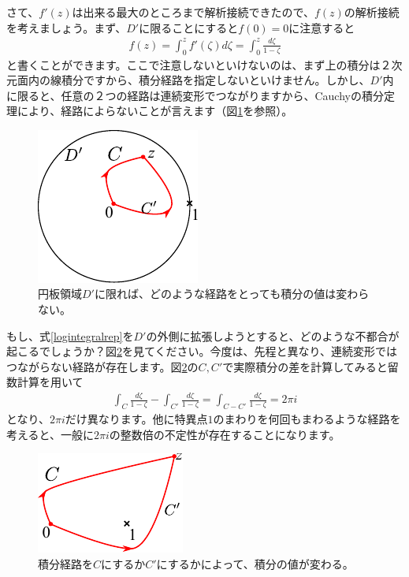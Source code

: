 \documentclass[report,paper=a4, fontsize=12pt, line_length=16cm, number_of_lines=33,dvipdfmx]{jlreq}
\numberwithin{equation}{section}
\begin{document}
さて、$f'(z)$は出来る最大のところまで解析接続できたので、$f(z)$の解析接続を考えましょう。まず、$D'$に限ることにすると$f(0)=0$に注意すると
\begin{align}
  f(z)=\int_0^{z}f'(\zeta)d\zeta=\int_0^{z}\frac{d\zeta}{1-\zeta}\label{logintegralrep}
\end{align}
と書くことができます。ここで注意しないといけないのは、まず上の積分は２次元面内の線積分ですから、積分経路を指定しないといけません。しかし、$D'$内に限ると、任意の２つの経路は連続変形でつながりますから、Cauchyの積分定理により、経路によらないことが言えます（図\ref{fig:regionlog}を参照）。
\begin{figure}[htbp]
  \centering
  \includegraphics{regionlog.pdf}
  \caption{円板領域$D'$に限れば、どのような経路をとっても積分の値は変わらない。}
  \label{fig:regionlog}
\end{figure}
もし、式\eqref{logintegralrep}を$D'$の外側に拡張しようとすると、どのような不都合が起こるでしょうか？図\ref{fig:multivalue}を見てください。今度は、先程と異なり、連続変形ではつながらない経路が存在します。図\ref{fig:multivalue}の$C,C'$で実際積分の差を計算してみると留数計算を用いて
\begin{align}
  \int_{C}\frac{d\zeta}{1-\zeta}-\int_{C'}\frac{d\zeta}{1-\zeta}=\int_{C-C'}\frac{d\zeta}{1-\zeta}
  =2\pi i
\end{align}
となり、$2\pi i$だけ異なります。他に特異点$1$のまわりを何回もまわるような経路を考えると、一般に$2\pi i$の整数倍の不定性が存在することになります。
\begin{figure}[htbp]
  \centering
  \includegraphics{multivalue.pdf}
  \caption{積分経路を$C$にするか$C'$にするかによって、積分の値が変わる。}
  \label{fig:multivalue}
\end{figure}
\end{document}

